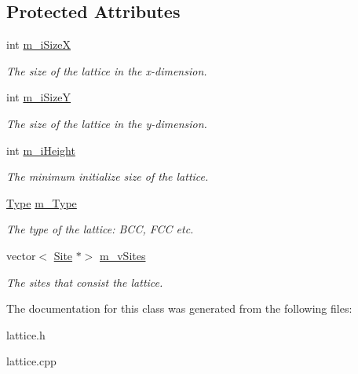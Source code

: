 \subsection*{Protected Attributes}
\begin{DoxyCompactItemize}
\item 
\mbox{\label{classLattice_ad965735fabbea7f2cd4fd841e3905714}} 
int \mbox{\hyperlink{classLattice_ad965735fabbea7f2cd4fd841e3905714}{m\+\_\+i\+SizeX}}
\begin{DoxyCompactList}\small\item\em The size of the lattice in the x-\/dimension. \end{DoxyCompactList}\item 
\mbox{\label{classLattice_a9c396b8ce6a9b4401a7f1f174e1a743d}} 
int \mbox{\hyperlink{classLattice_a9c396b8ce6a9b4401a7f1f174e1a743d}{m\+\_\+i\+SizeY}}
\begin{DoxyCompactList}\small\item\em The size of the lattice in the y-\/dimension. \end{DoxyCompactList}\item 
\mbox{\label{classLattice_a41e09891128085d8d324c11267f27ef5}} 
int \mbox{\hyperlink{classLattice_a41e09891128085d8d324c11267f27ef5}{m\+\_\+i\+Height}}
\begin{DoxyCompactList}\small\item\em The minimum initialize size of the lattice. \end{DoxyCompactList}\item 
\mbox{\label{classLattice_a81dd6a7c57c02a8172544d7b67b84a16}} 
\mbox{\hyperlink{classLattice_a0521158021627f01f6bb0a9c72df65e2}{Type}} \mbox{\hyperlink{classLattice_a81dd6a7c57c02a8172544d7b67b84a16}{m\+\_\+\+Type}}
\begin{DoxyCompactList}\small\item\em The type of the lattice\+: B\+CC, F\+CC etc. \end{DoxyCompactList}\item 
\mbox{\label{classLattice_abefaff3c5de9ff49cc0e61d4a8259c93}} 
vector$<$ \mbox{\hyperlink{classSurfaceTiles_1_1Site}{Site}} $\ast$$>$ \mbox{\hyperlink{classLattice_abefaff3c5de9ff49cc0e61d4a8259c93}{m\+\_\+v\+Sites}}
\begin{DoxyCompactList}\small\item\em The sites that consist the lattice. \end{DoxyCompactList}\end{DoxyCompactItemize}


The documentation for this class was generated from the following files\+:\begin{DoxyCompactItemize}
\item 
lattice.\+h\item 
lattice.\+cpp\end{DoxyCompactItemize}
